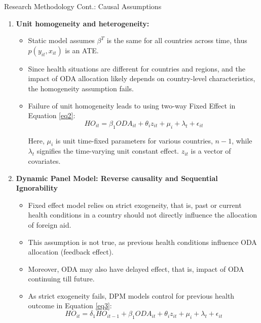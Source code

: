 \documentclass[aspectratio=169,handout, 10pt]{beamer}
\begin{document}
\begin{frame}{Research Methodology Cont.: Causal Assumptions}
\begin{enumerate}
    \item \textbf{Unit homogeneity and heterogeneity:} 
    \begin{itemize}
        \item Static model assumes $\beta^T$ is the same for all countries across time, thus $p(y_{it}, x_{it})$ is an ATE.
        \item Since health situations are different for countries and regions, and the impact of ODA allocation likely depends on country-level characteristics, the homogeneity assumption fails. 
        \item Failure of unit homogeneity leads to using two-way Fixed Effect in Equation \ref{eq2}:
        \begin{equation}
    HO_{it} = \beta_{1} ODA_{it} + \theta_{i} z_{it} + \mu_i + \lambda_t + \epsilon_{it}
    \label{eq2}
\end{equation}

Here, $\mu_i$ is unit time-fixed parameters for various countries, $n-1$, while $\lambda_t$ signifies the time-varying unit constant effect. $z_{it}$ is a vector of covariates.
        
    \end{itemize}
\item \textbf{Dynamic Panel Model: Reverse causality and Sequential Ignorability}
    \begin{itemize}
        \item  Fixed effect model relies on strict exogeneity, that is, past or current health conditions in a country should not directly influence the allocation of foreign aid. 
        \item This assumption is not true, as previous health conditions influence ODA allocation (feedback effect). 
        \item Moreover, ODA may also have delayed effect, that is, impact of ODA continuing till future. 
        \item As strict exogeneity fails, DPM models control for previous health outcome in Equation \ref{eq3}:
\begin{equation}
    HO_{it} = \delta_1 HO_{it-1} + \beta_{1} ODA_{it} + \theta_{i} z_{it} + \mu_i + \lambda_t + \epsilon_{it}
    \label{eq3}
\end{equation}
     
    \end{itemize}
\end{enumerate}
\end{frame}
\end{document}
